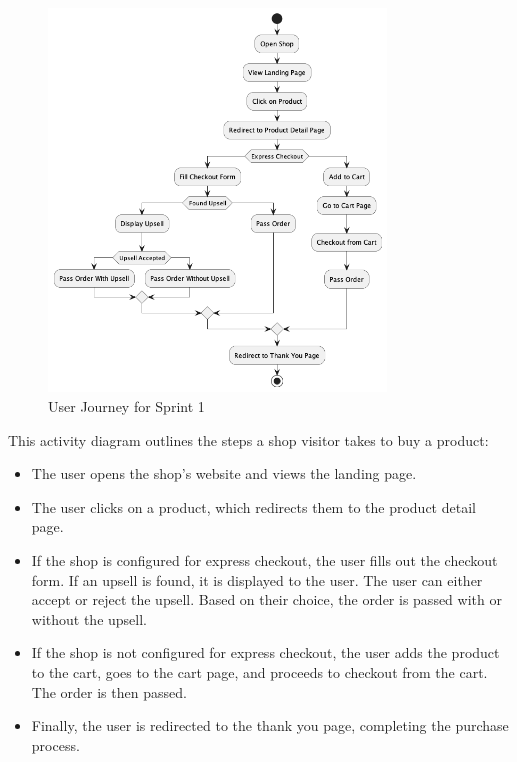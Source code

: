 \begin{figure}[H]
    \centering
    \includegraphics[width=0.8\textwidth]{images/sprintOneActivity.png}
    \caption{User Journey for Sprint 1}
    \label{fig:user_journey_sprint1}
\end{figure}

This activity diagram outlines the steps a shop visitor takes to buy a product:

\begin{itemize}
    \item The user opens the shop's website and views the landing page.
    \item The user clicks on a product, which redirects them to the product detail page.
    \item If the shop is configured for express checkout, the user fills out the checkout form. If an upsell is found, it is displayed to the user. The user can either accept or reject the upsell. Based on their choice, the order is passed with or without the upsell.
    \item If the shop is not configured for express checkout, the user adds the product to the cart, goes to the cart page, and proceeds to checkout from the cart. The order is then passed.
    \item Finally, the user is redirected to the thank you page, completing the purchase process.
\end{itemize}

